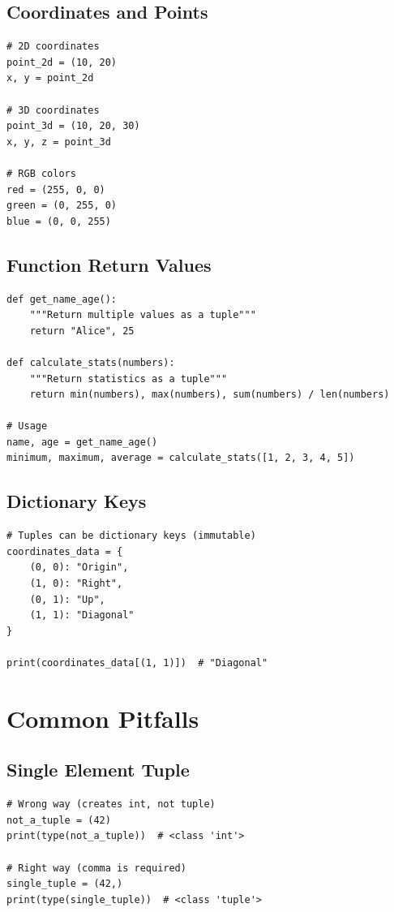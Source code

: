 \documentclass[12pt,a4paper]{article}
\begin{document}
\subsection{Coordinates and Points}

\begin{lstlisting}
# 2D coordinates
point_2d = (10, 20)
x, y = point_2d

# 3D coordinates
point_3d = (10, 20, 30)
x, y, z = point_3d

# RGB colors
red = (255, 0, 0)
green = (0, 255, 0)
blue = (0, 0, 255)
\end{lstlisting}

\subsection{Function Return Values}

\begin{lstlisting}
def get_name_age():
    """Return multiple values as a tuple"""
    return "Alice", 25

def calculate_stats(numbers):
    """Return statistics as a tuple"""
    return min(numbers), max(numbers), sum(numbers) / len(numbers)

# Usage
name, age = get_name_age()
minimum, maximum, average = calculate_stats([1, 2, 3, 4, 5])
\end{lstlisting}

\subsection{Dictionary Keys}

\begin{lstlisting}
# Tuples can be dictionary keys (immutable)
coordinates_data = {
    (0, 0): "Origin",
    (1, 0): "Right",
    (0, 1): "Up",
    (1, 1): "Diagonal"
}

print(coordinates_data[(1, 1)])  # "Diagonal"
\end{lstlisting}

\section{Common Pitfalls}

\subsection{Single Element Tuple}

\begin{lstlisting}
# Wrong way (creates int, not tuple)
not_a_tuple = (42)
print(type(not_a_tuple))  # <class 'int'>

# Right way (comma is required)
single_tuple = (42,)
print(type(single_tuple))  # <class 'tuple'>
\end{lstlisting}
\end{document}
